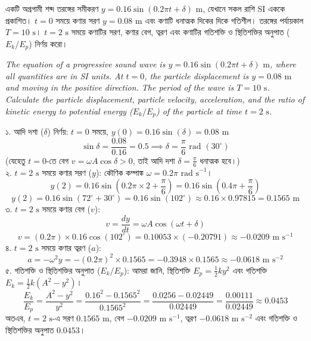 \documentclass[12pt, a4paper]{article}
\begin{document}
\newpage
\begin{tcolorbox}[questionbox={প্রশ্ন (Question) 1}]
\noindent
একটি অগ্রগামী শব্দ তরঙ্গের সমীকরণ $y = 0.16 \sin(0.2\pi t + \delta)\text{ m}$, যেখানে সকল রাশি SI এককে প্রকাশিত। $t = 0$ সময়ে কণার সরণ $y = 0.08\text{ m}$ এবং কণাটি ধনাত্মক দিকের দিকে গতিশীল। তরঙ্গের পর্যায়কাল $T = 10\text{ s}$। $t = 2\text{ s}$ সময়ে কণাটির সরণ, কণার বেগ, ত্বরণ এবং কণাটির গতিশক্তি ও স্থিতিশক্তির অনুপাত ($E_k / E_p$) নির্ণয় করো।

\vspace{0.8em}
\begin{english}
\noindent\textit{\color{darkgray}
The equation of a progressive sound wave is $y = 0.16 \sin(0.2\pi t + \delta)\text{ m}$, where all quantities are in SI units. At $t = 0$, the particle displacement is $y = 0.08\text{ m}$ and moving in the positive direction. The period of the wave is $T = 10\text{ s}$. Calculate the particle displacement, particle velocity, acceleration, and the ratio of kinetic energy to potential energy ($E_k / E_p$) of the particle at time $t = 2\text{ s}$.
}
\end{english}
\end{tcolorbox}

\vspace{1em}

\begin{tcolorbox}[solutionbox={সমাধান (Solution)}]
\noindent
১. আদি দশা ($\delta$) নির্ণয়: $t = 0$ সময়ে, $y(0) = 0.16 \sin(\delta) = 0.08\text{ m}$
\[ \sin\delta = \frac{0.08}{0.16} = 0.5 \implies \delta = \frac{\pi}{6}\text{ rad } (30^\circ) \]
(যেহেতু $t=0$-তে বেগ $v = \omega A \cos\delta > 0$, তাই আদি দশা $\delta = \frac{\pi}{6}$ ধনাত্মক হবে।) \\
২. $t = 2\text{ s}$ সময়ে কণার সরণ ($y$): কৌণিক কম্পাঙ্ক $\omega = 0.2\pi\text{ rad s}^{-1}$।
\[ y(2) = 0.16 \sin\left(0.2\pi \times 2 + \frac{\pi}{6}\right) = 0.16 \sin\left(0.4\pi + \frac{\pi}{6}\right) \]
\[ y(2) = 0.16 \sin(72^\circ + 30^\circ) = 0.16 \sin(102^\circ) \approx 0.16 \times 0.97815 = 0.1565\text{ m} \]
৩. $t = 2\text{ s}$ সময়ে কণার বেগ ($v$):
\[ v = \frac{dy}{dt} = \omega A \cos(\omega t + \delta) \]
\[ v = (0.2\pi) \times 0.16 \cos(102^\circ) = 0.10053 \times (-0.20791) \approx -0.0209\text{ m s}^{-1} \]
৪. $t = 2\text{ s}$ সময়ে কণার ত্বরণ ($a$):
\[ a = -\omega^2 y = -(0.2\pi)^2 \times 0.1565 = -0.3948 \times 0.1565 \approx -0.0618\text{ m s}^{-2} \]
৫. গতিশক্তি ও স্থিতিশক্তির অনুপাত ($E_k / E_p$): আমরা জানি, স্থিতিশক্তি $E_p = \frac{1}{2} k y^2$ এবং গতিশক্তি $E_k = \frac{1}{2} k (A^2 - y^2)$।
\[ \frac{E_k}{E_p} = \frac{A^2 - y^2}{y^2} = \frac{0.16^2 - 0.1565^2}{0.1565^2} = \frac{0.0256 - 0.02449}{0.02449} = \frac{0.00111}{0.02449} \approx 0.0453 \]
অতএব, $t = 2\text{ s}$-এ সরণ $0.1565\text{ m}$, বেগ $-0.0209\text{ m s}^{-1}$, ত্বরণ $-0.0618\text{ m s}^{-2}$ এবং গতিশক্তি ও স্থিতিশক্তির অনুপাত $0.0453$।
\end{tcolorbox}
\end{document}
